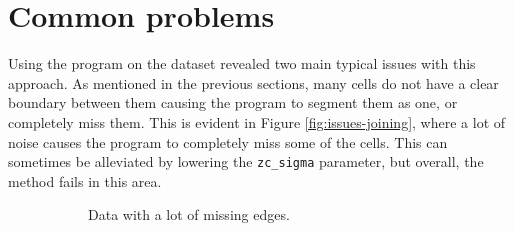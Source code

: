\documentclass[
  digital,     %
  oneside,     %
  nosansbold,  %
  nocolorbold, %
  lof,         %
  lot,         %
]{fithesis4}
\begin{document}
\section{Common problems}

Using the program on the dataset revealed two main typical issues with this
approach. As mentioned in the previous sections, many cells do not have a clear boundary
between them causing the program to segment them as one, or completely miss them.
This is evident in Figure \ref{fig:issues-joining}, where a lot of noise
causes the program to completely miss some of the cells. This can sometimes be
alleviated by lowering the \texttt{zc\_sigma} parameter, but overall, the method
fails in this area.

\begin{figure}
    \begin{subfigure}[t]{0.3\linewidth}
        \caption{Data with a lot of missing edges.}
    \end{subfigure}
    \begin{subfigure}[t]{0.3\linewidth}

\end{subfigure}
\end{figure}
\end{document}
